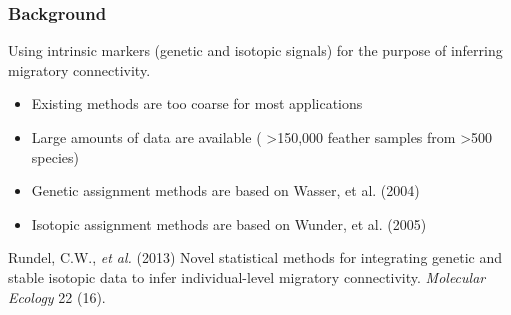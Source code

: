 \documentclass[t]{beamer}\usepackage[]{graphicx}\usepackage[]{color}
\begin{document}
\begin{frame}
\frametitle{Background}

Using intrinsic markers (genetic and isotopic signals) for the purpose of inferring migratory connectivity.

\vspace{2mm}

\begin{itemize}
\item Existing methods are too coarse for most applications
\vspace{2mm}
\item Large amounts of data are available ( \textgreater{}150,000 feather samples from \textgreater{}500 species)
\vspace{2mm}
\item Genetic assignment methods are based on Wasser, et al. (2004)
\vspace{2mm}
\item Isotopic assignment methods are based on Wunder, et al. (2005)
\end{itemize}

\vfill

{\scriptsize
Rundel, C.W., \textit{et al.} (2013) Novel statistical methods for integrating genetic and stable isotopic data to infer individual-level migratory connectivity. \textit{Molecular Ecology} 22 (16).
}
\end{frame}

\end{document}
